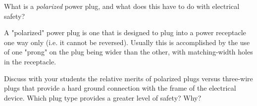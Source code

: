 

What is a {\it polarized} power plug, and what does this have to do with electrical safety?







A "polarized" power plug is one that is designed to plug into a power receptacle one way only (i.e. it cannot be reversed).  Usually this is accomplished by the use of one "prong" on the plug being wider than the other, with matching-width holes in the receptacle.







Discuss with your students the relative merits of polarized plugs versus three-wire plugs that provide a hard ground connection with the frame of the electrical device.  Which plug type provides a greater level of safety?  Why?




